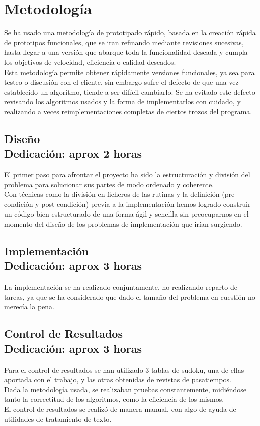 \documentclass[12pt,letterpaper]{article}
\begin{document}
\clearpage
\section{Metodología}
Se ha usado una metodología de prototipado rápido, basada en la
creación rápida de prototipos funcionales, que se iran refinando
mediante revisiones sucesivas, hasta llegar a una versión que
abarque toda la funcionalidad deseada y cumpla los objetivos de
velocidad, eficiencia o calidad deseados. \\
Esta metodología permite obtener rápidamente versiones
funcionales, ya sea para testeo o discusión con el cliente, sin
embargo sufre el defecto de que una vez establecido un algoritmo,
tiende a ser difícil cambiarlo. Se ha evitado este defecto revisando
los algoritmos usados y la forma de implementarlos con cuidado, y
realizando a veces reimplementaciones completas de ciertos trozos del
programa.
\subsection{Diseño\\ {\small Dedicación: aprox 2 horas}}
El primer paso para afrontar el proyecto ha sido la estructuración y
división del problema para solucionar sus partes de modo ordenado
y coherente.\\
Con técnicas como la división en ficheros de las rutinas y la
definición (pre-condición y post-condición) previa a la implementación
hemos logrado construir un código bien estructurado de una forma ágil
y sencilla sin preocuparnos en el momento del diseño de los problemas
de implementación que irían surgiendo.
\subsection{Implementación\\ {\small Dedicación: aprox 3 horas}}
La implementación se ha realizado conjuntamente, no realizando
reparto de tareas, ya que se ha considerado que dado el tamaño del
problema en cuestión no merecía la pena.
\subsection{Control de Resultados\\ {\small Dedicación: aprox 3 horas}}
Para el control de resultados se han utilizado 3 tablas de sudoku, una
de ellas aportada con el trabajo, y las otras obtenidas de revistas de
pasatiempos.\\
Dada la metodología usada, se realizaban pruebas constantemente,
midiéndose tanto la correctitud de los algoritmos, como la eficiencia
de los mismos.\\
El control de resultados se realizó de manera manual, con algo de
ayuda de utilidades de tratamiento de texto.
\end{document}
